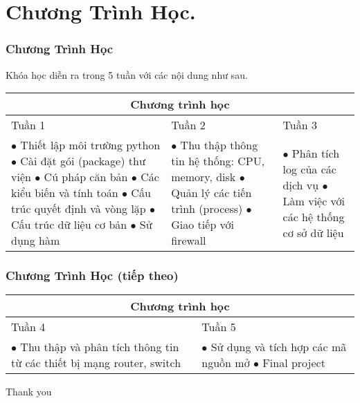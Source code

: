 \documentclass{beamer}
\begin{document}
\section{Chương Trình Học.} 
\begin{frame}[label=sylabus]
\frametitle{Chương Trình Học}

Khóa học diễn ra trong 5 tuần với các nội dung như sau. 

\begin{tabular}{ |p{4cm}||p{3cm}||p{3cm}|  }
 \hline
 \multicolumn{3}{|c|}{Chương trình học} \\
 \hline
 Tuần 1& Tuần 2 & Tuần 3 \\
 \hline
  $\bullet$ Thiết lập môi trường python \newline
  $\bullet$ Cài đặt gói (package) thư viện \newline      
  $\bullet$ Cú pháp căn bản \newline
  $\bullet$ Các kiểu biến và tính toán \newline
  $\bullet$ Cấu trúc quyết định và vòng lặp \newline
  $\bullet$ Cấu trúc dữ liệu cơ bản  \newline
  $\bullet$ Sử dụng hàm   \newline
   & $\bullet$ Thu thập thông tin hệ thống: CPU, memory, disk \newline
   $\bullet$ Quản lý các tiến trình (process) \newline $\bullet$ Giao tiếp với firewall \newline   & $\bullet$ Phân tích log của các dịch vụ \newline $\bullet$ Làm việc với các hệ thống cơ sở dữ liệu \newline \\
 \hline
\end{tabular}


\end{frame}

\begin{frame}[label=syllabus]
\frametitle{Chương Trình Học (tiếp theo)}

\begin{tabular}{ |p{4cm}||p{4cm}||  }
 \hline
 \multicolumn{2}{|c|}{Chương trình học} \\
 \hline
 Tuần 4 & Tuần 5  \\
 \hline
$\bullet$ Thu thập và phân tích thông tin từ các thiết bị mạng router, switch \newline
   & $\bullet$ Sử dụng và tích hợp các mã nguồn mở   \newline  $\bullet$ Final project  \newline   \\
 \hline
\end{tabular}


\end{frame}




\begin{frame}
\Huge{\centerline{Thank you}}
\end{frame}

\end{document}
